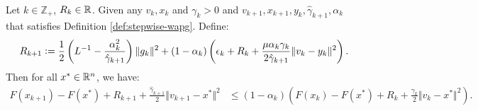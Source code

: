 \documentclass[12pt]{article}
\begin{document}
    \begin{proposition}\label{prop:stepwise-lyapunov}\;\\
        Let $k \in \mathbb Z_+$, $R_k \in \mathbb R$. 
        Given any $v_k, x_k$ and $\gamma_k > 0$ and $v_{k + 1}, x_{k + 1}, y_k, \hat \gamma_{k + 1}, \alpha_k$ that satisfies Definition \ref{def:stepwise-wapg}. 
        Define: 
        \begin{align}\label{eqn:stepwise-lya-1}
            R_{k + 1}
            \vcentcolon=
            \frac{1}{2}\left(
                L^{-1} - \frac{\alpha_k^2}{\hat \gamma_{k + 1}}
            \right)\Vert g_k\Vert^2
            + 
            (1 - \alpha_k)
            \left(
                \epsilon_k + R_k + 
                \frac{\mu\alpha_k\gamma_k}{2\hat \gamma_{k + 1}}
                \Vert v_k - y_k\Vert^2
            \right). 
        \end{align}
        Then for all $x^* \in \mathbb R^n$, we have:
        {\small
        \begin{align}\label{ineq:stepwise-lya-2}
            F(x_{k + 1}) - F(x^*) + R_{k + 1} + \frac{\hat \gamma_{k + 1}}{2}\Vert v_{k + 1} - x^*\Vert^2
            &\le 
            (1 - \alpha_k)
            \left(
                F(x_k) - F(x^*) + R_k + \frac{\gamma_{k}}{2}\Vert v_k - x^*\Vert^2
            \right). 
        \end{align}
        }
    \end{proposition}
\end{document}
